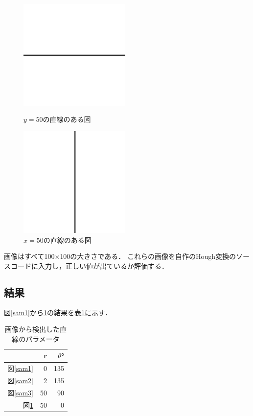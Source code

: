 \documentclass[titlepage]{jarticle}
\begin{document}
\begin{figure}[H]
  \begin{minipage}{0.495\hsize}
    \centering
    \includegraphics[width=5.5cm]{img/sam3.png}
    \caption{$y = 50$の直線のある図}
    \label{sam3}
  \end{minipage}
  \begin{minipage}{0.495\hsize}
    \centering
    \includegraphics[width=5.5cm]{img/sam4.png}
    \caption{$x = 50$の直線のある図}
    \label{sam4}
  \end{minipage}
\end{figure}
画像はすべて100$\times$100の大きさである．
これらの画像を自作のHough変換のソースコードに入力し，正しい値が出ているか評価する．

\subsection{結果}
図\ref{sam1}から\ref{sam4}の結果を表\ref{tab}に示す．

\begin{table}[H]
  \caption{画像から検出した直線のパラメータ}
  \label{tab}
  \centering
  \begin{tabular}{r|rr}\hline
                & r  & $\theta$° \\\hline\hline
    図\ref{sam1} & 0  & 135       \\
    図\ref{sam2} & 2  & 135       \\
    図\ref{sam3} & 50 & 90        \\
    図\ref{sam4} & 50 & 0         \\\hline
  \end{tabular}
\end{table}
\end{document}
